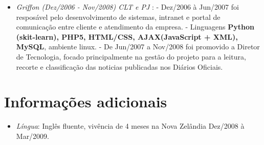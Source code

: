 \documentclass[a4paper,11pt]{article}
\begin{document}
\begin{itemize}
\item \emph{Griffon (Dez/2006 - Nov/2008) CLT e PJ }: 
  \subitem - Dez/2006 à Jun/2007 foi resposável pelo desenvolvimento de sistemas, intranet e portal de comunicação entre cliente e atendimento da empresa. 
  \subitem - Linguagens \textbf{Python (skit-learn), PHP5, HTML/CSS, AJAX(JavaScript + XML), MySQL}, ambiente linux.
  \subitem - De Jun/2007 a Nov/2008 foi promovido a Diretor de Tecnologia, focado principalmente na gestão do projeto para a leitura, recorte e classificação das noticias publicadas nos Diários Oficiais. 

\end{itemize}
\section{Informações adicionais}
\begin{itemize}
\item \emph{Língua}: Inglês fluente, vivência de 4 meses na Nova Zelândia Dez/2008 à Mar/2009.
\end{itemize}
\end{document}
